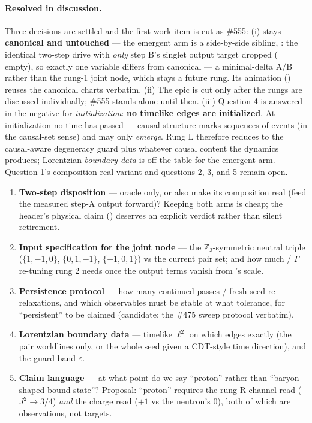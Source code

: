 \documentclass[11pt]{article}
\newcommand{\Z}{\mathbb{Z}}
\begin{document}
\paragraph{Resolved in discussion.} Three decisions are settled and the first work item
is cut as \#555:
(i)  stays \textbf{canonical and untouched} — the emergent arm is a
side-by-side sibling, : the identical two-step drive with
\emph{only} step B's singlet output target dropped ( empty), so
exactly one variable differs from canonical — a minimal-delta A/B rather than the
rung-1 joint node, which stays a future rung. Its animation
() reuses the canonical charts verbatim.
(ii) The epic is cut only after the rungs are discussed individually; \#555 stands
alone until then.
(iii) Question 4 is answered in the negative for \emph{initialization}: \textbf{no
timelike edges are initialized}. At initialization no time has passed — causal
structure marks sequences of events (in the causal-set sense) and may only
\emph{emerge}. Rung L therefore reduces to the causal-aware degeneracy guard plus
whatever causal content the dynamics produces; Lorentzian \emph{boundary data} is off
the table for the emergent arm.
Question 1's composition-real variant and questions 2, 3, and 5 remain open.

\begin{enumerate}[leftmargin=2em]
  \item \textbf{Two-step disposition} --- oracle only, or also make its composition real
    (feed the measured step-A output forward)? Keeping both arms is cheap; the header's
    physical claim () deserves an explicit verdict rather than
    silent retirement.
  \item \textbf{Input specification for the joint node} --- the $\Z_3$-symmetric neutral
    triple ($\{1,-1,0\}$, $\{0,1,-1\}$, $\{-1,0,1\}$) vs the current pair set; and how
    much  / $\Gamma$ re-tuning rung 2 needs once the output
    terms vanish from 's scale.
  \item \textbf{Persistence protocol} --- how many continued passes / fresh-seed
    re-relaxations, and which observables must be stable at what tolerance, for
    ``persistent'' to be claimed (candidate: the \#475 sweep protocol verbatim).
  \item \textbf{Lorentzian boundary data} --- timelike $\ell^2$ on which edges exactly
    (the pair worldlines only, or the whole seed given a CDT-style time direction), and
    the guard band $\varepsilon$.
  \item \textbf{Claim language} --- at what point do we say ``proton'' rather than
    ``baryon-shaped bound state''? Proposal: ``proton'' requires the rung-R channel read
    ($J^2 \to 3/4$) \emph{and} the charge read ($+1$ vs the neutron's $0$), both of
    which are observations, not targets.
\end{enumerate}
\end{document}
